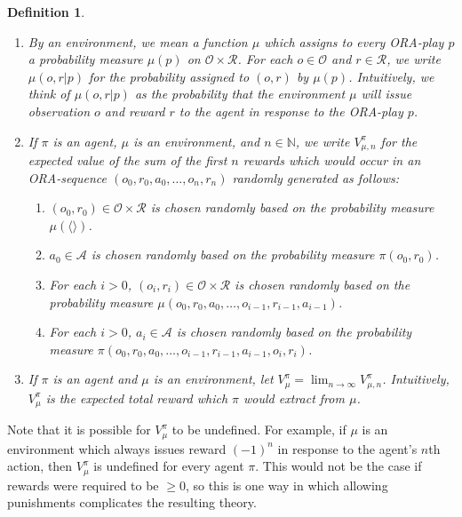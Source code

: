 \documentclass{article}
\newtheorem{definition}[theorem]{Definition}
\begin{document}
\begin{definition}
\begin{enumerate}
        will take action $a$ in response to the ORA-prompt $p$.
        \item
        By an \emph{environment}, we mean a function $\mu$
        which assigns to every ORA-play $p$ a probability measure $\mu(p)$
        on $\mathcal O\times\mathcal R$.
        For each $o\in\mathcal O$ and $r\in\mathcal R$, we write $\mu(o,r|p)$
        for the probability assigned to $(o,r)$ by $\mu(p)$.
        Intuitively, we think of $\mu(o,r|p)$ as the
        probability that the environment
        $\mu$ will issue observation $o$ and reward $r$ to the agent in response
        to the ORA-play $p$.
        \item
        If $\pi$ is an agent, $\mu$ is an environment, and $n\in\mathbb N$,
        we write $V^\pi_{\mu,n}$ for the expected value of the sum of
        the first $n$ rewards which would occur in an ORA-sequence
        $(o_0,r_0,a_0,\ldots,o_n,r_n)$ randomly generated as follows:
        \begin{enumerate}
            \item $(o_0,r_0)\in \mathcal O\times\mathcal R$ is chosen randomly based
            on the probability measure $\mu(\langle\rangle)$.
            \item $a_0\in\mathcal A$ is chosen randomly based on the probability
            measure $\pi(o_0,r_0)$.
            \item
            For each $i>0$,
            $(o_i,r_i)\in\mathcal O\times\mathcal R$ is chosen randomly based on
            the probability measure $\mu(o_0,r_0,a_0,\ldots,o_{i-1},r_{i-1},a_{i-1})$.
            \item
            For each $i>0$,
            $a_i\in\mathcal A$ is chosen randomly based on the probability measure
            $\pi(o_0,r_0,a_0,\ldots,o_{i-1},r_{i-1},a_{i-1},o_i,r_i)$.
        \end{enumerate}
        \item
        If $\pi$ is an agent and $\mu$ is an environment,
        let $V^\pi_\mu=\lim_{n\to\infty}V^{\pi}_{\mu,n}$.
        Intuitively, $V^\pi_\mu$ is the expected total reward which $\pi$ would extract
        from $\mu$.
    \end{enumerate}
\end{definition}

Note that it is possible for $V^\pi_\mu$ to be undefined.
For example, if $\mu$ is an environment which always issues
reward $(-1)^n$ in response to the agent's $n$th action,
then $V^\pi_\mu$ is undefined for every agent $\pi$.
This would not be the case if rewards were required to be $\geq 0$,
so this is one way in which allowing
punishments complicates the resulting theory.
\end{document}
